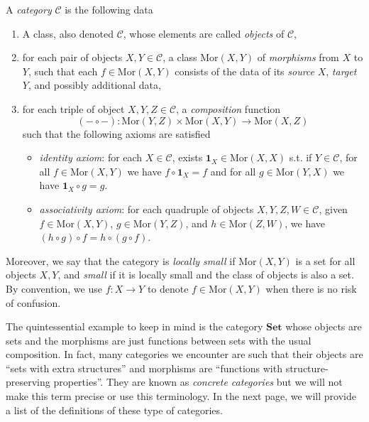 \documentclass[11pt]{book}
\begin{document}
\begin{definition}A \textit{category} $\mathcal C$ is the following data
\begin{enumerate}[label=(\roman*)]
	\item A class, also denoted $\mathcal C$, whose elements are called \textit{objects} of $\mathcal C$,
	\item for each pair of objects $X,Y\in \mathcal C$, a class $\mathrm{Mor}(X,Y)$ of \textit{morphisms} from $X$ to $Y$, such that each $f\in \mathrm{Mor}(X,Y)$ consists of the data of its \textit{source} $X$, \textit{target} $Y$, and possibly additional data,
	\item for each triple of object $X,Y,Z\in\mathcal C$, a \textit{composition} function 
	\[(-\circ -):\mathrm{Mor}(Y,Z)\times\mathrm{Mor}(X,Y)\rightarrow \mathrm{Mor}(X,Z)\]
	such that the following axioms are satisfied
	\begin{itemize}
		\item \textit{identity axiom}: for each $X\in\mathcal{C}$, exists $\mathbf 1_X\in\mathrm{Mor}(X,X)$ s.t. if $Y\in\mathcal C$, for all $f\in\mathrm{Mor}(X,Y)$ we have $f\circ \mathbf 1_X=f$ and for all $g\in \mathrm{Mor}(Y,X)$ we have $\mathbf 1_X\circ g=g$.
		\item \textit{associativity axiom}: for each quadruple of objects $X,Y,Z,W\in \mathcal C$, given $f\in \mathrm{Mor}(X,Y)$, $g\in \mathrm{Mor}(Y,Z)$, and $h\in\mathrm{Mor}(Z,W)$, we have $(h\circ g)\circ f=h\circ (g\circ f)$.
	\end{itemize}
\end{enumerate}
Moreover, we say that the category is \textit{locally small} if $\mathrm{Mor}(X,Y)$ is a set for all objects $X,Y$, and \textit{small} if it is locally small and the class of objects is also a set. By convention, we use $f:X\rightarrow Y$ to denote $f\in\mathrm{Mor}(X,Y)$ when there is no risk of confusion. 
\end{definition}
\begin{example}The quintessential example to keep in mind is the category $\mathbf{Set}$ whose objects are sets and the morphisms are just functions between sets with the usual composition. In fact, many categories we encounter are such that their objects are ``sets with extra structures'' and morphisms are ``functions with structure-preserving properties''. They are known as \textit{concrete categories} but we will not make this term precise or use this terminology. In the next page, we will provide a list of the definitions of these type of categories.
\end{example}
\end{document}
